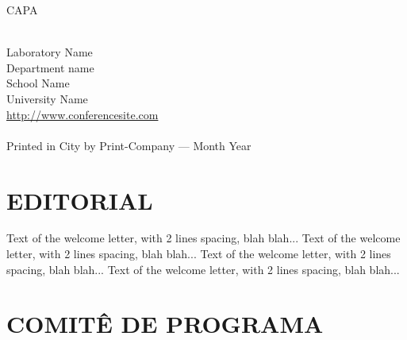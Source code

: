 \documentclass[a4paper,12pt,twoside,onesidepapers,%
  electronic,%
  papers=final,%
  headers=allpages,%
	onecoltoc,
	tocnum=right,
	twocolindex,
	movepagenumber=true,%
hyperref={bookmarksdepth=1,bookmarksopen,bookmarksopenlevel=0,%
 linkcolor=black,urlcolor=blue}, %
  geometry={text={175truemm,226truemm},%
    inner=0.69in,top=25mm,bottom=28mm,footskip=10.4mm,voffset=0mm},%
]{confproc}
\author{\procpdfauthor}
\title{\procpdftitle}
\begin{document}
\frontmatter
\setcounter{page}{1}

CAPA
\newpage

\vspace *{1.7cm}
\thispagestyle{empty}
\\ Laboratory Name\\ Department name\\
School Name\\ University Name\\
\url{http://www.conferencesite.com}\\
\vspace*{0.15cm}\newline
{}\\
\vspace*{0.35cm}\newline
\noindent Printed in City by Print-Company --- Month Year
\newpage


\vspace*{0.6cm}
\section*{\centering \normalfont \LARGE EDITORIAL}
\vspace*{0.6cm}
\doublespace

\begin{center}
	\begin{minipage}[h]{14cm}
		Text of the welcome letter, with 2 lines spacing, blah blah...
		Text of the welcome letter, with 2 lines spacing, blah blah...
		Text of the welcome letter, with 2 lines spacing, blah blah...
		Text of the welcome letter, with 2 lines spacing, blah blah...
	\end{minipage}
\end{center}
\singlespace
\newpage


\vspace*{0.6cm}
\section*{\centering \normalfont \LARGE COMITÊ DE PROGRAMA}
\vspace*{0.6cm}
\doublespace
\end{document}

